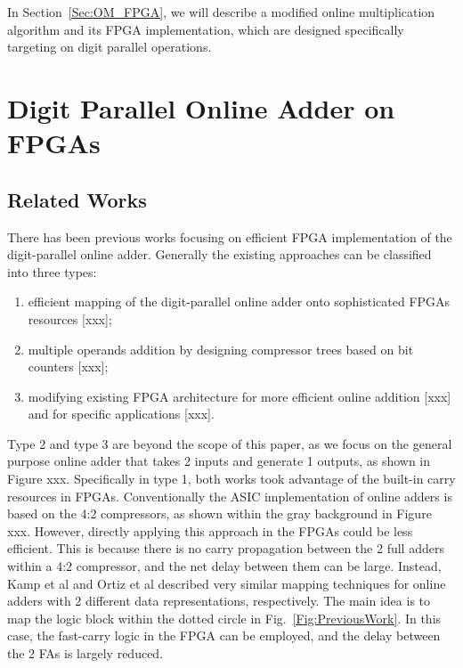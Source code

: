 \documentclass[conference]{IEEEtran}
\begin{document}
In Section~\ref{Sec:OM_FPGA}, we will describe a modified online multiplication algorithm and its FPGA implementation, which are designed specifically targeting on digit parallel operations.



\section{Digit Parallel Online Adder on FPGAs}\label{Sec:OA_FPGA}
\subsection{Related Works}
There has been previous works focusing on efficient FPGA implementation of the digit-parallel online adder. Generally the existing approaches can be classified into three types:%
\begin{enumerate}
	\item efficient mapping of the digit-parallel online adder onto sophisticated FPGAs resources [xxx];
	\item multiple operands addition by designing compressor trees based on bit counters [xxx];
	\item modifying existing FPGA architecture for more efficient online addition [xxx] and for specific applications [xxx].
\end{enumerate}

Type 2 and type 3 are beyond the scope of this paper, as we focus on the general purpose online adder that takes 2 inputs and generate 1 outputs, as shown in Figure xxx. Specifically in type 1, both works took advantage of the built-in carry resources in FPGAs. Conventionally the ASIC implementation of online adders is based on the 4:2 compressors, as shown within the gray background in Figure xxx. However, directly applying this approach in the FPGAs could be less efficient. This is because there is no carry propagation between the 2 full adders within a 4:2 compressor, and the net delay between them can be large. Instead, Kamp et al and Ortiz et al described very similar mapping techniques for online adders with 2 different data representations, respectively. The main idea is to map the logic block within the dotted circle in Fig.~\ref{Fig:PreviousWork}. In this case, the fast-carry logic in the FPGA can be employed, and the delay between the 2 FAs is largely reduced.
\end{document}

